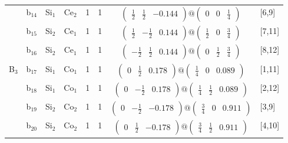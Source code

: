 \documentclass[fleqn,10pt,landscape]{article}
\begin{document}
\begin{itemize}
\begin{center}
\begin{longtable}{cc|cc|c|c|c|l}
& b$_{14}$ & Si$_{1}$ & Ce$_{2}$ & 1 & 1 & $\begin{pmatrix} \frac{1}{2} & \frac{1}{2} & -0.144 \end{pmatrix}@\begin{pmatrix} 0 & 0 & \frac{1}{4} \end{pmatrix}$ & [6,9] \\
& b$_{15}$ & Si$_{2}$ & Ce$_{1}$ & 1 & 1 & $\begin{pmatrix} \frac{1}{2} & - \frac{1}{2} & 0.144 \end{pmatrix}@\begin{pmatrix} \frac{1}{2} & 0 & \frac{3}{4} \end{pmatrix}$ & [7,11] \\
& b$_{16}$ & Si$_{2}$ & Ce$_{1}$ & 1 & 1 & $\begin{pmatrix} - \frac{1}{2} & \frac{1}{2} & 0.144 \end{pmatrix}@\begin{pmatrix} 0 & \frac{1}{2} & \frac{3}{4} \end{pmatrix}$ & [8,12] \\ \hline
B$_{3}$ & b$_{17}$ & Si$_{1}$ & Co$_{1}$ & 1 & 1 & $\begin{pmatrix} 0 & \frac{1}{2} & 0.178 \end{pmatrix}@\begin{pmatrix} \frac{1}{4} & 0 & 0.089 \end{pmatrix}$ & [1,11] \\
& b$_{18}$ & Si$_{1}$ & Co$_{1}$ & 1 & 1 & $\begin{pmatrix} 0 & - \frac{1}{2} & 0.178 \end{pmatrix}@\begin{pmatrix} \frac{1}{4} & \frac{1}{2} & 0.089 \end{pmatrix}$ & [2,12] \\
& b$_{19}$ & Si$_{2}$ & Co$_{2}$ & 1 & 1 & $\begin{pmatrix} 0 & - \frac{1}{2} & -0.178 \end{pmatrix}@\begin{pmatrix} \frac{3}{4} & 0 & 0.911 \end{pmatrix}$ & [3,9] \\
& b$_{20}$ & Si$_{2}$ & Co$_{2}$ & 1 & 1 & $\begin{pmatrix} 0 & \frac{1}{2} & -0.178 \end{pmatrix}@\begin{pmatrix} \frac{3}{4} & \frac{1}{2} & 0.911 \end{pmatrix}$ & [4,10] \\

\end{longtable}
\end{center}
\end{itemize}
\end{document}
